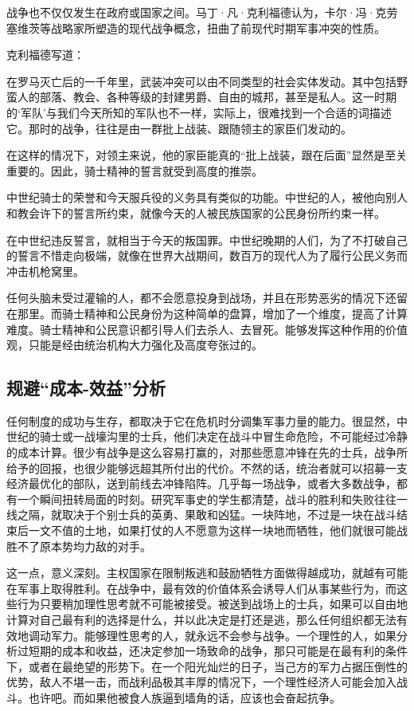 战争也不仅仅发生在政府或国家之间。马丁·凡·克利福德认为，卡尔·冯·克劳塞维茨等战略家所塑造的现代战争概念，扭曲了前现代时期军事冲突的性质。

克利福德写道：


\begin{tcolorbox}
在罗马灭亡后的一千年里，武装冲突可以由不同类型的社会实体发动。其中包括野蛮人的部落、教会、各种等级的封建男爵、自由的城邦，甚至是私人。这一时期的‘军队’与我们今天所知的军队也不一样，实际上，很难找到一个合适的词描述它。那时的战争，往往是由一群批上战装、跟随领主的家臣们发动的。
\end{tcolorbox}

在这样的情况下，对领主来说，他的家臣能真的“批上战装，跟在后面”显然是至关重要的。因此，骑士精神的誓言就受到高度的推崇。

中世纪骑士的荣誉和今天服兵役的义务具有类似的功能。中世纪的人，被他向别人和教会许下的誓言所约束，就像今天的人被民族国家的公民身份所约束一样。

在中世纪违反誓言，就相当于今天的叛国罪。中世纪晚期的人们，为了不打破自己的誓言不惜走向极端，就像在世界大战期间，数百万的现代人为了履行公民义务而冲击机枪窝里。

任何头脑未受过灌输的人，都不会愿意投身到战场，并且在形势恶劣的情况下还留在那里。而骑士精神和公民身份为这种简单的盘算，增加了一个维度，提高了计算难度。骑士精神和公民意识都引导人们去杀人、去冒死。能够发挥这种作用的价值观，只能是经由统治机构大力强化及高度夸张过的。

\subsection{规避“成本-效益”分析}
任何制度的成功与生存，都取决于它在危机时分调集军事力量的能力。很显然，中世纪的骑士或一战壕沟里的士兵，他们决定在战斗中冒生命危险，不可能经过冷静的成本计算。很少有战争是这么容易打赢的，对那些愿意冲锋在先的士兵，战争所给予的回报，也很少能够远超其所付出的代价。不然的话，统治者就可以招募一支经济最优化的部队，送到前线去冲锋陷阵。几乎每一场战争，或者大多数战争，都有一个瞬间扭转局面的时刻。研究军事史的学生都清楚，战斗的胜利和失败往往一线之隔，就取决于个别士兵的英勇、果敢和凶猛。一块阵地，不过是一块在战斗结束后一文不值的土地，如果打仗的人不愿意为这样一块地而牺牲，他们就很可能战胜不了原本势均力敌的对手。

这一点，意义深刻。主权国家在限制叛逃和鼓励牺牲方面做得越成功，就越有可能在军事上取得胜利。在战争中，最有效的价值体系会诱导人们从事某些行为，而这些行为只要稍加理性思考就不可能被接受。被送到战场上的士兵，如果可以自由地计算对自己最有利的选择是什么，并以此决定是打还是逃，那么任何组织都无法有效地调动军力。能够理性思考的人，就永远不会参与战争。一个理性的人，如果分析过短期的成本和收益，还决定参加一场致命的战争，那只可能是在最有利的条件下，或者在最绝望的形势下。在一个阳光灿烂的日子，当己方的军力占据压倒性的优势，敌人不堪一击，而战利品极其丰厚的情况下，一个理性经济人可能会加入战斗。也许吧。而如果他被食人族逼到墙角的话，应该也会奋起抗争。

